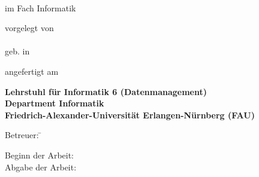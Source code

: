 \begin{titlepage}

  \begin{center}
    
    {\Huge \bfseries
      \thesistitle{}\\
    } 
    
    \vspace*{1cm}
    \thethesis{} im Fach Informatik
    \vspace{2cm}
    
    {\large vorgelegt von} \\
    \vspace*{0.7cm}
    {\Large \bfseries \myname} \\
    \vspace*{0.7cm}
    {\large geb. \birthday{} in \birthplace{}} 
    
    \vspace{1.5cm}
    
    angefertigt am 

    \vspace{1cm}
    
    {\bfseries
      Lehrstuhl für Informatik 6 (Datenmanagement) \\
      Department Informatik \\
      Friedrich-Alexander-Universität Erlangen-Nürnberg (FAU)\\
      }
    
    \vspace{0.5cm}
\end{center}
\begin{tabbing}
    Betreuer: \= \corrector{}\\
    \> \tutor{} 
\end{tabbing}
    \vspace{0.25cm}
    
\begin{tabbing}
  Beginn der Arbeit: \startofwork{} \\
  Abgabe der Arbeit: \dayofdoom{}
\end{tabbing}

\end{titlepage}

